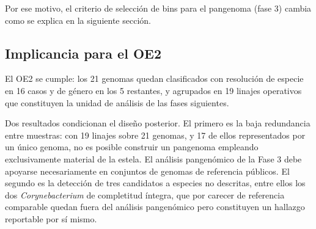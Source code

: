 Por ese motivo, el criterio de selección de bins para el pangenoma (fase 3) cambia como se explica en la siguiente sección. 

\subsection{Implicancia para el OE2}

El OE2 se cumple: los 21 genomas quedan clasificados con resolución de especie
en 16 casos y de género en los 5 restantes, y agrupados en 19 linajes
operativos que constituyen la unidad de análisis de las fases siguientes.

Dos resultados condicionan el diseño posterior. El primero es la baja
redundancia entre muestras: con 19 linajes sobre 21 genomas, y 17 de ellos
representados por un único genoma, no es posible construir un pangenoma
empleando exclusivamente material de la estela. El análisis pangenómico de la
Fase 3 debe apoyarse necesariamente en conjuntos de genomas de referencia
públicos. El segundo es la detección de tres candidatos a especies no descritas,
entre ellos los dos \textit{Corynebacterium} de completitud íntegra, que por
carecer de referencia comparable quedan fuera del análisis pangenómico pero
constituyen un hallazgo reportable por sí mismo.

